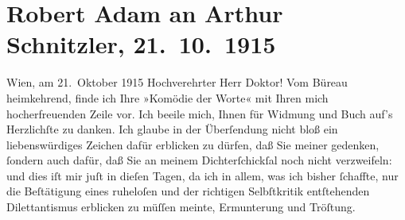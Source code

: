 

         
         \renewcommand{\erwaehntePersonen}{Personen: Robert Adam}
         \renewcommand{\erwaehnteOrte}{Orte: Wien}
         \renewcommand{\erwaehnteWerke}{Werke: Komödie der Worte. Drei Einakter}
               \section[Robert Adam an Arthur Schnitzler, 21. 10. 1915]{ Robert Adam an Arthur Schnitzler, 21. 10. 1915}\nopagebreak{}\rehead{ }\begin{ledgroupsized}[t]{13cm}\normalsize\beginnumbering{} \toendnotes[C]{\smallbreak\pagebreak[2]} 
\toendnotes[C]{\smallbreak}\pstart
           \raggedleft{}{\pb}Wien, am 21. Oktober 1915\pend
           \pstart{}Hochverehrter Herr Doktor!\pend\pstart
           Vom Büreau heimkehrend, finde ich Ihre »Komödie der
                  Worte« mit Ihren mich hocherfreuenden Zeile vor.\pend
           \pstart
           Ich beeile mich, Ihnen für Widmung und Buch auf’s Herzlichſte zu danken.\pend
           \pstart
           Ich glaube in der Überſendung nicht bloß ein liebenswürdiges Zeichen dafür erblicken
               zu dürfen, daß Sie meiner gedenken, ſondern auch dafür, daß Sie an meinem
               Dichterſchickſal noch nicht verzweifeln: und dies iſt mir juſt in dieſen Tagen, da
               ich in allem, was ich bisher ſchaffte, nur die Beſtätigung eines ruheloſen und der
               richtigen Selbſtkritik {\pb}entſtehenden Dilettantismus
               erblicken zu müſſen meinte, Ermunterung und Tröſtung.\pend

\end{ledgroupsized}
